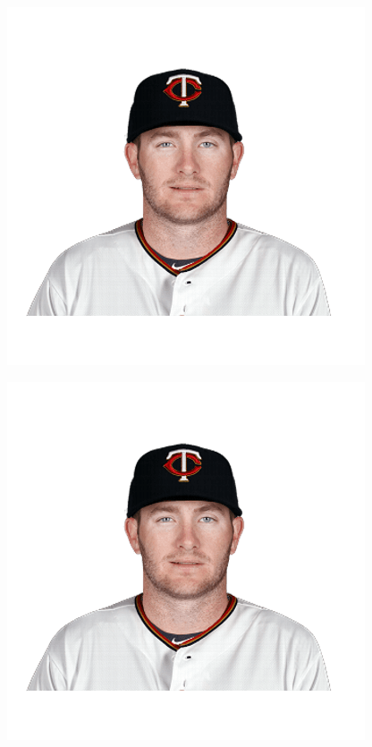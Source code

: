 \documentclass[UTF8]{ctexart}
\begin{document}
\begin{enumerate}
\begin{itemize}
\begin{mdframed}
  \begin{minipage}{0.5\textwidth}
    \includegraphics[width=\linewidth]{good}
  \end{minipage}
  \hfill
  \begin{minipage}{0.5\textwidth}
    \includegraphics[width=\linewidth]{good}
  \end{minipage}
\end{mdframed}
\end{itemize}
\end{enumerate}
\end{document}

